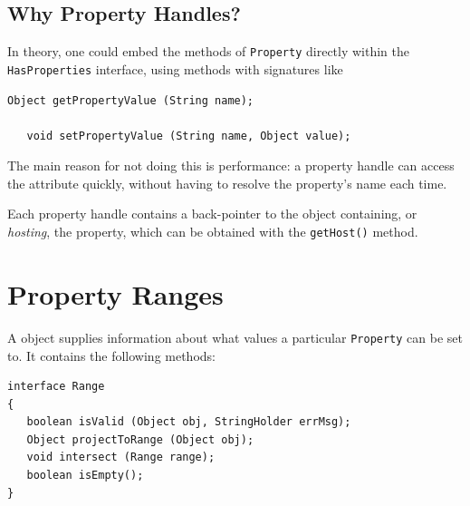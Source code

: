 \subsection{Why Property Handles?}

In theory, one could embed the methods of {\tt Property}
directly within the {\tt HasProperties} interface, using
methods with signatures like 
\begin{lstlisting}[]
   Object getPropertyValue (String name);

   void setPropertyValue (String name, Object value);
\end{lstlisting}
The main reason for not doing this is performance: a property handle
can access the attribute quickly, without having to resolve the
property's name each time. 

Each property handle contains a back-pointer to the object containing,
or {\it hosting}, the property, which can be obtained with the 
{\tt getHost()} method.

\label{rangesSec}
\section{Property Ranges}

A  object supplies information about what values a
particular {\tt Property} can be set to. It contains the following
methods:

\begin{lstlisting}[]
interface Range
{
   boolean isValid (Object obj, StringHolder errMsg);
   Object projectToRange (Object obj);
   void intersect (Range range);
   boolean isEmpty();
}
\end{lstlisting}

